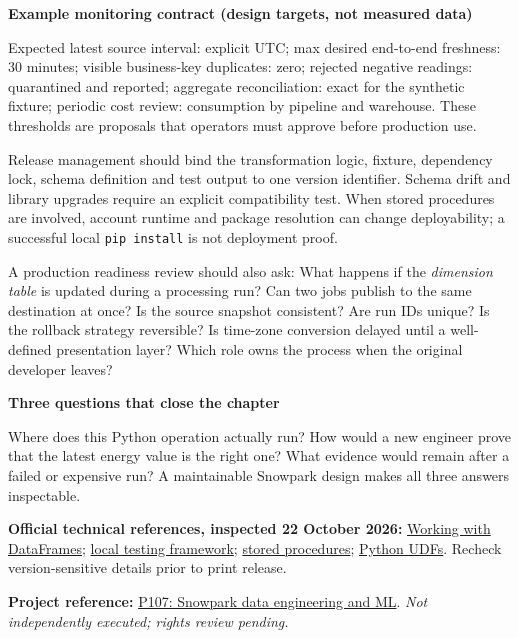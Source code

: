 \documentclass[11pt,twoside]{article}
\newcommand{\repo}[2]{\par\begingroup\fontsize{8.0}{9.6}\selectfont\sffamily\color{inkgray}\textbf{Project reference:} \href{#2}{#1}. \textit{Not independently executed; rights review pending.}\par\endgroup}
\begin{document}
\begin{whitebox}\textbf{Example monitoring contract (design targets, not measured data)}\par
Expected latest source interval: explicit UTC; max desired end-to-end freshness: 30 minutes; visible business-key duplicates: zero; rejected negative readings: quarantined and reported; aggregate reconciliation: exact for the synthetic fixture; periodic cost review: consumption by pipeline and warehouse. These thresholds are proposals that operators must approve before production use.\end{whitebox}
Release management should bind the transformation logic, fixture, dependency lock, schema definition and test output to one version identifier. Schema drift and library upgrades require an explicit compatibility test. When stored procedures are involved, account runtime and package resolution can change deployability; a successful local \texttt{pip install} is not deployment proof.

A production readiness review should also ask: What happens if the \emph{dimension table} is updated during a processing run? Can two jobs publish to the same destination at once? Is the source snapshot consistent? Are run IDs unique? Is the rollback strategy reversible? Is time-zone conversion delayed until a well-defined presentation layer? Which role owns the process when the original developer leaves?
\begin{insight}\textbf{Three questions that close the chapter}\par
Where does this Python operation actually run? How would a new engineer prove that the latest energy value is the right one? What evidence would remain after a failed or expensive run? A maintainable Snowpark design makes all three answers inspectable.\end{insight}
\textbf{Official technical references, inspected 22 October 2026:} \href{https://docs.snowflake.com/en/developer-guide/snowpark/python/working-with-dataframes}{Working with DataFrames}; \href{https://docs.snowflake.com/en/developer-guide/snowpark/python/testing-locally}{local testing framework}; \href{https://docs.snowflake.com/en/developer-guide/snowpark/python/creating-sprocs}{stored procedures}; \href{https://docs.snowflake.com/en/developer-guide/snowpark/python/creating-udfs}{Python UDFs}. Recheck version-sensitive details prior to print release.
\repo{P107: Snowpark data engineering and ML}{https://github.com/Snowflake-Labs/sfguide-getting-started-dataengineering-ml-snowpark-python}
\newpage
\end{document}
